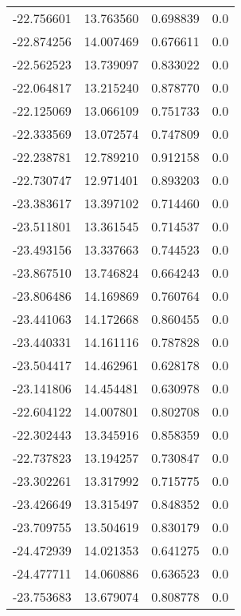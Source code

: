\begin{tabular}{rrrr}
      -22.756601 &        13.763560 &    0.698839 &   0.0 \\
      -22.874256 &        14.007469 &    0.676611 &   0.0 \\
      -22.562523 &        13.739097 &    0.833022 &   0.0 \\
      -22.064817 &        13.215240 &    0.878770 &   0.0 \\
      -22.125069 &        13.066109 &    0.751733 &   0.0 \\
      -22.333569 &        13.072574 &    0.747809 &   0.0 \\
      -22.238781 &        12.789210 &    0.912158 &   0.0 \\
      -22.730747 &        12.971401 &    0.893203 &   0.0 \\
      -23.383617 &        13.397102 &    0.714460 &   0.0 \\
      -23.511801 &        13.361545 &    0.714537 &   0.0 \\
      -23.493156 &        13.337663 &    0.744523 &   0.0 \\
      -23.867510 &        13.746824 &    0.664243 &   0.0 \\
      -23.806486 &        14.169869 &    0.760764 &   0.0 \\
      -23.441063 &        14.172668 &    0.860455 &   0.0 \\
      -23.440331 &        14.161116 &    0.787828 &   0.0 \\
      -23.504417 &        14.462961 &    0.628178 &   0.0 \\
      -23.141806 &        14.454481 &    0.630978 &   0.0 \\
      -22.604122 &        14.007801 &    0.802708 &   0.0 \\
      -22.302443 &        13.345916 &    0.858359 &   0.0 \\
      -22.737823 &        13.194257 &    0.730847 &   0.0 \\
      -23.302261 &        13.317992 &    0.715775 &   0.0 \\
      -23.426649 &        13.315497 &    0.848352 &   0.0 \\
      -23.709755 &        13.504619 &    0.830179 &   0.0 \\
      -24.472939 &        14.021353 &    0.641275 &   0.0 \\
      -24.477711 &        14.060886 &    0.636523 &   0.0 \\
      -23.753683 &        13.679074 &    0.808778 &   0.0 \\

\end{tabular}
